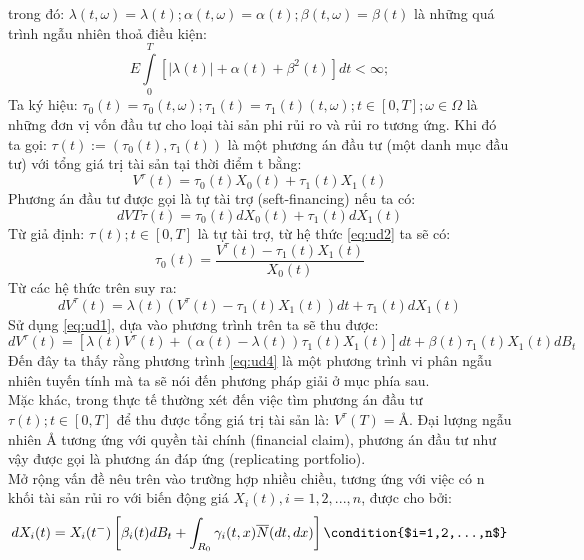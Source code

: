 \documentclass[14pt,a4paper]{article}
\numberwithin{equation}{section}
\begin{document}
trong đó: $\lambda(t,\omega)=\lambda(t);\alpha(t,\omega)=\alpha(t);\beta(t,\omega)=\beta(t)$ là những quá trình ngẫu nhiên thoả điều kiện:
\begin{equation*}
	E\int\limits_{0}^{T}[|\lambda(t)|+\alpha(t)+\beta^2(t)]dt<\infty;
\end{equation*}
Ta ký hiệu: $\tau_0(t)=\tau_0(t,\omega);\tau_1(t)=\tau_1(t)(t,\omega);t\in[0,T];\omega\in \Omega$ là những đơn vị vốn đầu tư cho loại tài sản phi rủi ro và rủi ro tương ứng. Khi đó ta gọi: $\tau(t):=(\tau_0(t),\tau_1(t))$ là một phương án đầu tư (một danh mục đầu tư) với tổng giá trị tài sản tại thời điểm t bằng:
\begin{equation}\label{eq:ud2}
	V^\tau(t)=\tau_0(t)X_0(t)+\tau_1(t)X_1(t)	
\end{equation}
Phương án đầu tư được gọi là tự tài trợ (seft-financing) nếu ta có:
\begin{equation}\label{eq:ud3}
	dVT\tau(t)=\tau_0(t)dX_0(t)+\tau_1(t)dX_1(t)
\end{equation}
Từ giả định: $\tau(t);t\in[0,T]$ là tự tài trợ, từ hệ thức \eqref{eq:ud2} ta sẽ có:
\begin{equation*}
	\tau_0(t)=\dfrac{V^\tau(t)-\tau_1(t)X_1(t)}{X_0(t)}
\end{equation*}
Từ các hệ thức trên suy ra:
\begin{equation*}
	dV^\tau(t)=\lambda(t)(V^\tau(t)-\tau_1(t)X_1(t))dt+\tau_1(t)dX_1(t)
\end{equation*}
Sử dụng \eqref{eq:ud1}, dựa vào phương trình trên ta sẽ thu được:
\begin{equation}\label{eq:ud4}
	dV^\tau(t)=[\lambda(t)V^\tau(t)+(\alpha(t)-\lambda(t))\tau_1(t)X_1(t)]dt +\beta(t)\tau_1(t)X_1(t)dB_t
\end{equation}
Đến đây ta thấy rằng phương trình \eqref{eq:ud4} là một phương trình vi phân ngẫu nhiên tuyến tính mà ta sẽ nói đến phương pháp giải ở mục phía sau.\\
Mặc khác, trong thực tế thường xét đến việc tìm phương án đầu tư $\tau(t);t\in[0,T]$ để thu được tổng giá trị tài sản là: $V^\tau(T)=\text{\AA}$. Đại lượng ngẫu nhiên $\text{\AA}$ tương ứng với quyền tài chính (financial claim), phương án đầu tư như vậy được gọi là phương án đáp ứng (replicating portfolio).\\
Mở rộng vấn đề nêu trên vào trường hợp nhiều chiều, tương ứng với việc có n khối tài sản rủi ro với biến động giá $X_i(t),i=1,2,...,n$, được cho bởi:
\begin{equation}\label{eq:ud5}
	dX_i(t)=X_i(t^-)\left[\beta_i(t)dB_t+\int_{R_0}\gamma_i(t,x)\overline{N}(dt,dx) \right] \condition{$i=1,2,...,n$}
\end{equation}
\end{document}
